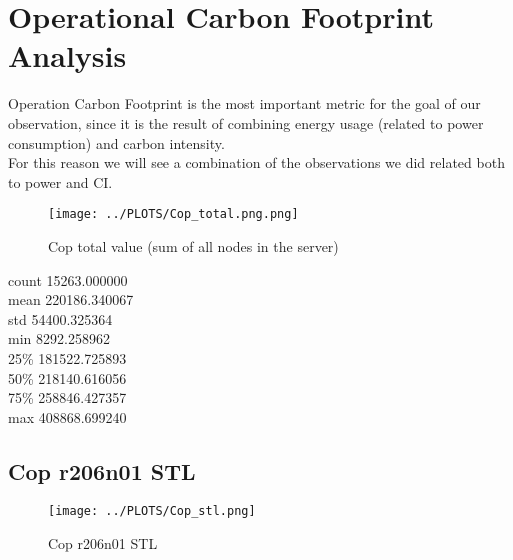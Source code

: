 \section{Operational Carbon Footprint Analysis}
Operation Carbon Footprint is the most important metric for the goal of our observation, since it is the result of combining energy usage (related to power consumption) and carbon intensity. \\
For this reason we will see a combination of the observations we did related both to power and CI.

\vspace{-15pt}

\begin{figure}[H]
\centering
\texttt{[image: ../PLOTS/Cop\_total.png.png]}
\captionsetup{skip=-10pt}
\caption{Cop total value (sum of all nodes in the server)}
\label{fig:Cop_total}
\end{figure}

\begin{center}
count     15263.000000 \\
mean     220186.340067 \\
std       54400.325364 \\
min        8292.258962 \\
25\%      181522.725893 \\
50\%      218140.616056 \\
75\%      258846.427357 \\
max      408868.699240   
\end{center}

\subsection{Cop r206n01 STL}

\vspace{-10pt}

\begin{figure}[H]
\centering
\texttt{[image: ../PLOTS/Cop\_stl.png]}
\caption{Cop r206n01 STL}
\label{fig:Cop_r206n01_stl}
\end{figure}
